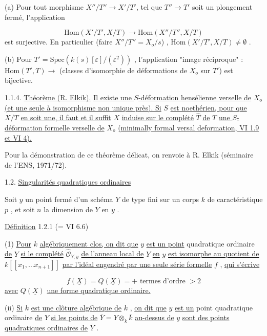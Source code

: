 (a)  Pour tout morphisme $X''/T'' \longrightarrow X'/T'$, tel que $T'' \to T'$ soit un plongement fermé, l'application

\begin{equation*}
\mathrm{Hom}(X'/T' , X/T) \longrightarrow \mathrm{Hom}(X''/T'' , X/T)
\end{equation*}
est surjective. En particulier (faire $X''/T'' = X_o/s$) , $\mathrm{Hom}(X'/T', X/T) \neq \emptyset$ .

(b)  Pour $T' = \mathrm{Spec}(k(s)[\varepsilon]/(\varepsilon^2))$ , l'application "image réciproque" : $\mathrm{Hom}(T',T) \to$ (classes d'isomorphie de déformations de $X_o$ sur $T'$) est bijective.



1.1.4. \underline{Théorème (R. Elkik).} \underline{Il existe une $S$-déformation hensélienne verselle de} $X_o$ \underline{(et une seule à isomorphisme non unique près). Si} $S$ \underline{est noethérien, pour que} $X/T$ \underline{en soit une, il faut et il suffit} $X$ \underline{induise sur le complété} $\widehat{T}$ \underline{de} $T$ \underline{une $S$-déformation formelle verselle de} $X_o$ \underline{(minimally formal versal deformation, VI 1.9 et VI 4).}

Pour la démonstration de ce théorème délicat, on renvoie à R. Elkik (séminaire de l'ENS, 1971/72).


1.2. \underline{Singularités quadratiques ordinaires}

Soit $y$ un point fermé d'un schéma $Y$ de type fini sur un corps $k$ de caractéristique $p$ , et soit $n$ la dimension de $Y$ en $y$ .


\underline{Définition} 1.2.1 (= VI 6.6)

(1) \underline{Pour} $k$ \underline{algébriquement clos, on dit que} $y$ \underline{est un point} quadratique ordinaire \underline{de} $Y$ \underline{si le complété} $\widehat{\mathcal{O}}_{Y,y}$ \underline{de l'anneau local de} $Y$ \underline{en} $y$ \underline{est isomorphe au quotient de} $k[[x_1,\ldots x_{n+1}]]$ \underline{par l'idéal engendré par une seule série formelle} $f$ , \underline{qui s'écrive}

\begin{equation}\tag{4.2.1}
f(\underline{X}) = Q(\underline{X}) = + \mbox{ termes d'ordre } > 2
\end{equation}
\underline{avec} $Q(\underline{X})$ \underline{une forme quadratique ordinaire.}

(ii) \underline{Si} $k$ \underline{est une clôture algébrique de} $k$ , \underline{on dit que} $y$ \underline{est un} point quadratique ordinaire \underline{de} $Y$ \underline{si les points de} $\overline{Y} = Y \otimes_k \overline{k}$ \underline{au-dessus de} $y$ \underline{sont des points quadratiques ordinaires de} $\overline{Y}$ .

